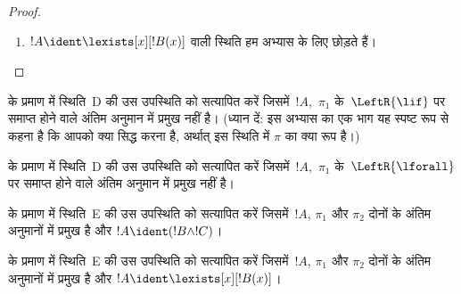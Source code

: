 \documentclass[../../../include/open-logic-section]{subfiles}
\begin{document}
\begin{proof}
\begin{enumerate}
!!{proof}~$\pi_1'$ का अंतिम अनुक्रम $\Gamma \Sequent \Delta, !B(c)$ है, जहाँ
$c$ किसी~$\RightR{\lforall}$ अनुमान का आइगेनचर है। अतः $c$,~$!B(x)$,
$\Gamma$ या~$\Delta$ में नहीं आता। हम !!{proof}~$\pi$ को नियमित मानते हैं,
इसलिए $c$ केवल निम्न~$\RightR{\lforall}$ अनुमान का आइगेनचर है और केवल उसके
ऊपर आता है; अर्थात् केवल~$\pi_1'$ में आता है और~$\pi_1'$ के किसी अनुमान का
आइगेनचर नहीं है। चूँकि $c$,~$\pi_2$ में नहीं आता, वह~$t$ में भी नहीं आ सकता।
 से !!{proof}~$\Subst{\pi_1'}{t}{c}$,
$\Gamma \Sequent \Delta, !B(t)$ का !!a{proof} है। अब हम आगमन परिकल्पना इस
!!{proof} पर लगाते हैं
\[
\AxiomC{}
\RightLabel{$\Subst{\pi_1'}{t}{c}$}
\Deduce$\Gamma \fCenter \Delta, !B(t)$
\AxiomC{}
\RightLabel{$\pi_2''$}
\Deduce$!B(t), \Gamma \fCenter \Delta$
\RightLabel{\CutCS}
\BinaryInf$\Gamma \fCenter \Delta$
\DisplayProof
\]
(आगमन परिकल्पना लागू होती है क्योंकि कट !!{formula}~$!B(t)$ है, अतः इस
!!{proof} की कट कोटि~$\pi$ से कम है।)
\item $!A \ident \lexists[x][!B(x)]$ वाली स्थिति हम अभ्यास के लिए छोड़ते हैं।
\end{enumerate}
\end{proof}

\begin{prob}
 के प्रमाण में स्थिति~D की उस उपस्थिति को सत्यापित करें
जिसमें~$!A$,~$\pi_1$ के~$\LeftR{\lif}$ पर समाप्त होने वाले अंतिम अनुमान में
प्रमुख नहीं है। (ध्यान दें: इस अभ्यास का एक भाग यह स्पष्ट रूप से कहना है कि
आपको क्या सिद्ध करना है, अर्थात् इस स्थिति में $\pi$ का क्या रूप है।)
\end{prob}

\begin{prob}
 के प्रमाण में स्थिति~D की उस उपस्थिति को सत्यापित करें
जिसमें~$!A$,~$\pi_1$ के~$\LeftR{\lforall}$ पर समाप्त होने वाले अंतिम अनुमान
में प्रमुख नहीं है।
\end{prob}

\begin{prob}
 के प्रमाण में स्थिति~E की उस उपस्थिति को सत्यापित करें
जिसमें~$!A$, $\pi_1$ और $\pi_2$ दोनों के अंतिम अनुमानों में प्रमुख है और $!A
\ident (!B \land !C)$।
\end{prob}

\begin{prob}
 के प्रमाण में स्थिति~E की उस उपस्थिति को सत्यापित करें
जिसमें~$!A$, $\pi_1$ और $\pi_2$ दोनों के अंतिम अनुमानों में प्रमुख है और $!A
\ident \lexists[x][!B(x)]$।
\end{prob}
\end{document}
